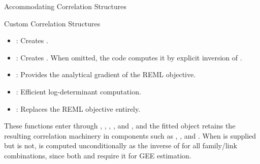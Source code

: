 \begin{Section}{Accommodating Correlation Structures}
\begin{SubSection}{Custom Correlation Structures}
\begin{itemize}
\item{} : Creates .
\item{} : Creates . When omitted,
the code computes it by explicit inversion of .
\item{} : Provides the analytical gradient of the REML
objective.
\item{} : Efficient log-determinant computation.
\item{} : Replaces the REML objective entirely.

\end{itemize}

These functions enter  through
, , ,
, and , and the fitted object
retains the resulting correlation machinery in components such as
, , and
. When  is supplied but
 is not,  is computed unconditionally as the inverse
of  for all family/link combinations, since both
 and  require it for GEE
estimation.
\end{SubSection}

\end{Section}
%
